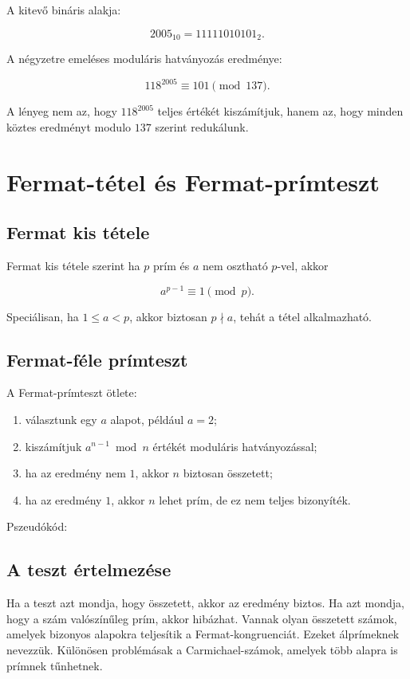 A kitevő bináris alakja:

\[
2005_{10}=11111010101_2.
\]

A négyzetre emeléses moduláris hatványozás eredménye:

\[
118^{2005}\equiv101\pmod{137}.
\]

A lényeg nem az, hogy $118^{2005}$ teljes értékét kiszámítjuk, hanem az, hogy minden köztes eredményt modulo $137$ szerint redukálunk.

\section{Fermat-tétel és Fermat-prímteszt}

\subsection{Fermat kis tétele}

Fermat kis tétele szerint ha $p$ prím és $a$ nem osztható $p$-vel, akkor

\[
a^{p-1}\equiv1\pmod p.
\]

Speciálisan, ha $1\leq a<p$, akkor biztosan $p\nmid a$, tehát a tétel alkalmazható.

\subsection{Fermat-féle prímteszt}

A Fermat-prímteszt ötlete:

\begin{enumerate}
  \item választunk egy $a$ alapot, például $a=2$;
  \item kiszámítjuk $a^{n-1}\bmod n$ értékét moduláris hatványozással;
  \item ha az eredmény nem $1$, akkor $n$ biztosan összetett;
  \item ha az eredmény $1$, akkor $n$ lehet prím, de ez nem teljes bizonyíték.
\end{enumerate}

Pszeudókód:


\subsection{A teszt értelmezése}

Ha a teszt azt mondja, hogy összetett, akkor az eredmény biztos. Ha azt mondja, hogy a szám valószínűleg prím, akkor hibázhat. Vannak olyan összetett számok, amelyek bizonyos alapokra teljesítik a Fermat-kongruenciát. Ezeket álprímeknek nevezzük. Különösen problémásak a Carmichael-számok, amelyek több alapra is prímnek tűnhetnek.


